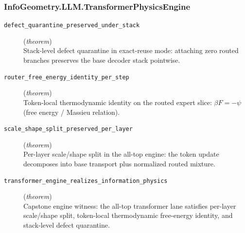 \documentclass[11pt,a4paper]{article}
\begin{document}
\subsubsection*{InfoGeometry.LLM.TransformerPhysicsEngine}
\begin{description}
  \item[\texttt{defect\_quarantine\_preserved\_under\_stack}] (\textit{theorem}) \\ Stack-level defect quarantine in exact-reuse mode: 
attaching zero routed branches preserves the base decoder stack pointwise.
  \item[\texttt{router\_free\_energy\_identity\_per\_step}] (\textit{theorem}) \\ Token-local thermodynamic identity on the routed expert slice: 
$\beta  F = -\psi $ (free energy / Massieu relation).
  \item[\texttt{scale\_shape\_split\_preserved\_per\_layer}] (\textit{theorem}) \\ Per-layer scale/shape split in the all-top engine: 
the token update decomposes into base transport plus normalized routed mixture.
  \item[\texttt{transformer\_engine\_realizes\_information\_physics}] (\textit{theorem}) \\ Capstone engine witness: 
the all-top transformer lane satisfies per-layer scale/shape split, 
token-local thermodynamic free-energy identity, and stack-level defect quarantine.
\end{description}
\end{document}

